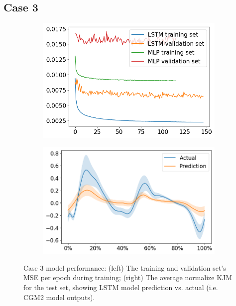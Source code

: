 \documentclass[../main.tex]{subfiles}
\begin{document}
\subsection{Case 3}
\label{sec:results-case3}

\begin{figure}[ht!]
     \centering
     \begin{subfigure}[b]{0.466\textwidth}
         \centering
         \includegraphics[width=\textwidth]{img/results/training_history/Case3_LSTMvsMLP_training.png}
     \end{subfigure}
     \hfill
     \begin{subfigure}[b]{0.524\textwidth}
         \centering
         \includegraphics[width=\textwidth]{img/results/test_prediction_evaluation/Case3_LSTM_test_prediction.png}
     \end{subfigure}
    \caption{Case 3 model performance: (left) The training and validation set's \ac{MSE} per epoch during training; (right) The average normalize \ac{KJM} for the test set, showing \ac{LSTM} model prediction vs. actual (i.e. CGM2 model outputs).}
    \label{fig:case3-performance-plots}
\end{figure}
\end{document}
